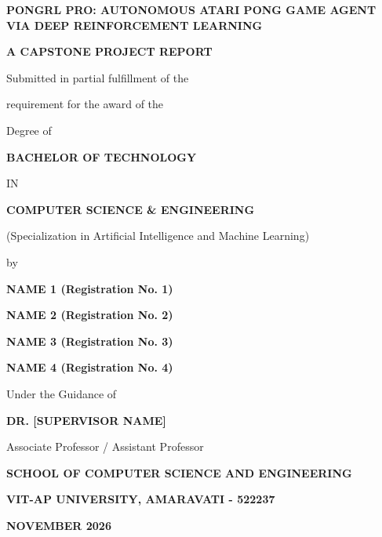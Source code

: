 \documentclass[12pt,a4paper]{report}
\begin{document}
\begin{titlepage}
\centering
\vspace*{0.5cm}
{\Large \textbf{PONGRL PRO: AUTONOMOUS ATARI PONG GAME AGENT VIA DEEP REINFORCEMENT LEARNING}\par}
\vspace{1.5cm}
{\large \textbf{A CAPSTONE PROJECT REPORT}\par}
\vspace{0.8cm}
{\normalsize Submitted in partial fulfillment of the\par}
{\normalsize requirement for the award of the\par}
{\normalsize Degree of\par}
\vspace{0.8cm}
{\large \textbf{BACHELOR OF TECHNOLOGY}\par}
{\normalsize IN\par}
{\large \textbf{COMPUTER SCIENCE \& ENGINEERING}\par}
{\normalsize (Specialization in Artificial Intelligence and Machine Learning)\par}
\vspace{1.2cm}
{\normalsize by\par}
\vspace{0.4cm}
{\large \textbf{NAME 1 (Registration No. 1)}\par}
{\large \textbf{NAME 2 (Registration No. 2)}\par}
{\large \textbf{NAME 3 (Registration No. 3)}\par}
{\large \textbf{NAME 4 (Registration No. 4)}\par}
\vspace{1.2cm}
{\normalsize Under the Guidance of\par}
\vspace{0.3cm}
{\large \textbf{DR. [SUPERVISOR NAME]}\par}
{\normalsize Associate Professor / Assistant Professor\par}
\vspace{1.5cm}
{\large \textbf{SCHOOL OF COMPUTER SCIENCE AND ENGINEERING}\par}
{\large \textbf{VIT-AP UNIVERSITY, AMARAVATI - 522237}\par}
\vspace{0.5cm}
{\large \textbf{NOVEMBER 2026}\par}
\end{titlepage}
\end{document}
